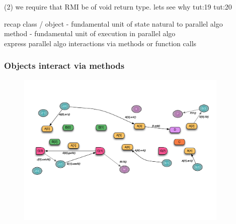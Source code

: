 \begin{frame}
(2) we require that RMI be of void return type. lets see why
tut:19
tut:20
\end{frame}


\begin{frame}
recap
    class / object - fundamental unit of state natural to parallel algo\\
    method - fundamental unit of execution in parallel algo\\
    express parallel algo interactions via methods or function calls
\end{frame}


\begin{frame}
  \frametitle{Objects interact via methods}
  \begin{figure}
    \includegraphics[width=0.9\textwidth]{../figures/progmodel/07-algo-via-objects-methods.pdf}
  \end{figure}
\end{frame}


